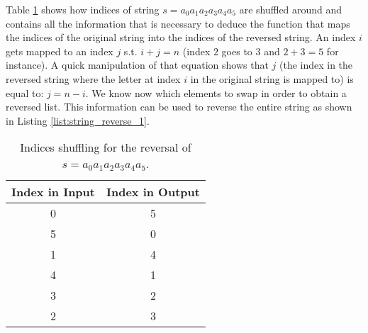 Table \ref{tab:string_reverse:shuffle} shows how indices of string $s=a_0 a_1 a_2 a_3 a_4 a_5$ are shuffled around and contains all the information that is necessary to deduce the function that maps the indices of the original string into the indices of the reversed string.
An index $i$ gets mapped to an index $j$ s.t. $i+j = n$ (index $2$ goes to $3$ and $2+3=5$ for instance).
A quick manipulation of that equation shows that $j$ (the index in the reversed string where the letter at index $i$ in the original string is mapped to) is equal to: $j = n-i$.
We know now which elements to swap in order to obtain a reversed list. This information can be used to reverse the entire string as shown in Listing \ref{list:string_reverse_1}.

\begin{table}[]
	\centering
	\begin{tabular}{|c|c|}
		\hline
		\multicolumn{1}{|l|}{Index in Input} & \multicolumn{1}{l|}{Index in Output} \\ \hline
		0                                    & 5                                    \\ \hline
		5                                    & 0                                    \\ \hline
		1                                    & 4                                    \\ \hline
		4                                    & 1                                    \\ \hline
		3                                    & 2                                    \\ \hline
		2                                    & 3                                    \\ \hline
	\end{tabular}
	\caption{Indices shuffling for the reversal of $s=a_0 a_1 a_2 a_3 a_4 a_5$.}
	\label{tab:string_reverse:shuffle}
\end{table}




